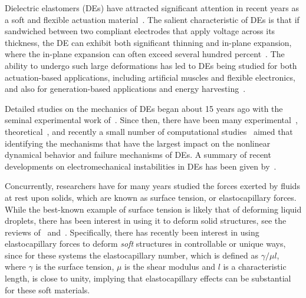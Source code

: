 \documentclass[final,authoryear,3p,times,twocolumn]{elsarticle}
\begin{document}


Dielectric elastomers (DEs) have attracted significant attention in recent years as a soft and flexible actuation material~\citep{carpiSCIENCE2010,brochuMRC2010,biddissMEP2008}.  The salient characteristic of DEs is that if sandwiched between two compliant electrodes that apply voltage across its thickness, the DE can exhibit both significant thinning and in-plane expansion, where the in-plane expansion can often exceed several hundred percent~\citep{keplingerSM2012}.  The ability to undergo such large deformations has led to DEs being studied for both actuation-based applications, including artificial muscles and flexible electronics, and also for generation-based applications and energy harvesting~\citep{carpiSCIENCE2010,brochuMRC2010,mirMT2007}.

Detailed studies on the mechanics of DEs began about 15 years ago with the seminal experimental work of~\citet{pelrineSAA1998,pelrineSCIENCE2000}.  Since then, there have been many experimental~\citep{foxJMPS2008,keplingerPNAS2010,kofodJIMSS2003,kofodSAA2005,peiSPIE2004,planteIJSS2006,planteSAA2007,planteSMS2007,schlaakSPIE2005,wisslerSAA2007a,zhangSPIE2004,chibaSPIE2008,wangPRL2011a,wangAM2012,wangNC2012}, theoretical~\citep{suoJMPS2008,suoAMSS2010,goulbourneJAM2005,dorfmannAM2005,dorfmannJE2006,mcmeekingJAM2005,patrickSAA2007,planteSAA2007,planteSMS2007,wisslerSMS2005}, and recently a small number of computational studies~\citep{parkIJSS2012,parkSM2013,parkCMAME2013,zhouIJSS2008,zhaoAPL2007,vuIJNME2007,wisslerSMS2005,buschelIJNME2013,khanCM2013,henannJMPS2013,liSMS2012} aimed that identifying the mechanisms that have the largest impact on the nonlinear dynamical behavior and failure mechanisms of DEs.  A summary of recent developments on electromechanical instabilities in DEs has been given by~\citet{zhaoAPR2014}.  

Concurrently, researchers have for many years studied the forces exerted by fluids at rest upon solids, which are known as surface tension, or elastocapillary forces.  While the best-known example of surface tension is likely that of deforming liquid droplets, there has been interest in using it to deform solid structures, see the reviews of~\citet{romanJPCM2010} and~\citet{liuAMS2012}.  Specifically, there has recently been interest in using elastocapillary forces to deform \emph{soft} structures in controllable or unique ways, since for these systems the elastocapillary number, which is defined as $\gamma/\mu l$, where $\gamma$ is the surface tension, $\mu$ is the shear modulus and $l$ is a characteristic length, is close to unity, implying that elastocapillary effects can be substantial for these soft materials.  
\end{document}
